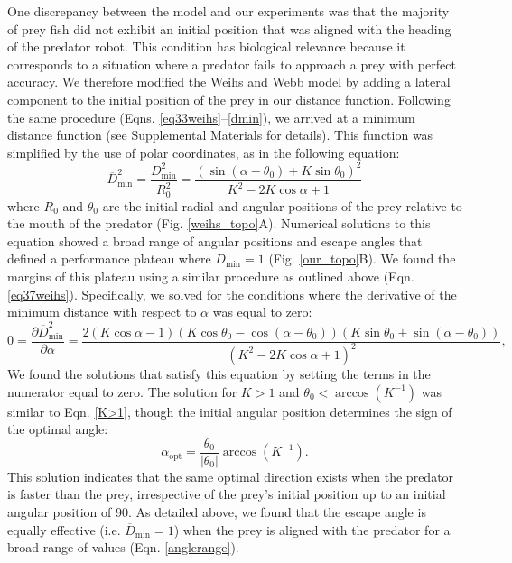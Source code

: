 \documentclass[12pt]{article}
\def\ds{\displaystyle}
\def\d{\partial}
\newcommand{\ol}{\overline}
\begin{document}
One discrepancy between the model and our experiments was that the majority of prey fish did not exhibit an initial position that was aligned with the heading of the predator robot. This condition has biological relevance because it corresponds to a situation where a predator fails to approach a prey with perfect accuracy. 
We therefore modified the Weihs and Webb model by adding a lateral component to the initial position of the prey in our distance function. 
Following the same procedure (Eqns. \ref{eq33weihs}--\ref{dmin}), we arrived at a minimum distance function (see Supplemental Materials for details). This function was simplified by the use of polar coordinates, as in the following equation:
%
\begin{equation}
\ol{D}^2_{\text{min}}= \ds\frac{{D}^2_{\text{min}}}{R_0^2 }=
\ds\frac{\left ( \sin(\alpha - \theta_0) + K \sin \theta_0 \right )^2}{K^2-2 K \cos \alpha +1} 
\label{Dmin_polar}
\end{equation}
%
where $R_0$ and $\theta_0$ are the initial radial and angular positions of the prey relative to the mouth of the predator (Fig. \ref{weihs_topo}A). Numerical solutions to this equation showed a broad range of angular positions and escape angles that defined a performance plateau where $D_{\text{min}}=1$ (Fig. \ref{our_topo}B). 
We found the margins of this plateau using a similar procedure as outlined above (Eqn. \ref{eq37weihs}). Specifically, we solved for the conditions where the derivative of the minimum distance with respect to $\alpha$ was equal to zero:
%
\begin{equation}
0 = \frac{\d \ol{D}^2_{\text{min}}}{\d \alpha} = 
\frac{2(K \cos \alpha - 1)(K\cos \theta_0 - \cos(\alpha - \theta_0))(K\sin \theta_0 + \sin(\alpha -\theta_0))}
{(K^2 - 2K \cos \alpha + 1)^2},
\label{DminDalpha}
\end{equation} 
%
We found the solutions that satisfy this equation by setting the terms in the numerator equal to zero. The solution for $K>1$ and $\theta_0 < \arccos(K^{-1})$ was similar to Eqn. \ref{K>1}, though the initial angular position determines the sign of the optimal angle: 
%
\begin{equation}
\alpha_{\text{opt}} = \frac{\theta_0}{|\theta_0|}  \arccos(K^{-1}).
\label{DminDalpha}
\end{equation} 
%
This solution indicates that the same optimal direction exists when the predator is faster than the prey, irrespective of the prey's initial position up to an initial angular position of 90\textdegree. As detailed above, we found that the escape angle is equally effective (i.e. $\ol D_{\text{min}}=1$) when the prey is aligned with the predator for a broad range of values (Eqn. \ref{anglerange}). 
\end{document}
